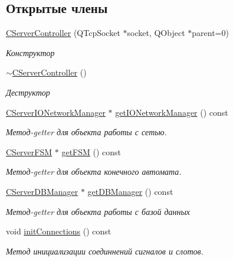 \subsection*{Открытые члены}
\begin{DoxyCompactItemize}
\item 
\hyperlink{class_c_server_controller_ac7fa78891be114aa9ae1985541d5a766}{C\+Server\+Controller} (Q\+Tcp\+Socket $\ast$socket, Q\+Object $\ast$parent=0)
\begin{DoxyCompactList}\small\item\em Конструктор \end{DoxyCompactList}\item 
\hyperlink{class_c_server_controller_ad1efc4b48869ea320005a9dc6e3e5483}{$\sim$\+C\+Server\+Controller} ()
\begin{DoxyCompactList}\small\item\em Деструктор \end{DoxyCompactList}\item 
\hyperlink{class_c_server_i_o_network_manager}{C\+Server\+I\+O\+Network\+Manager} $\ast$ \hyperlink{class_c_server_controller_a9934f4eb54e1e1debd1aa6fd5e036012}{get\+I\+O\+Network\+Manager} () const
\begin{DoxyCompactList}\small\item\em Метод-\/getter для объекта работы с сетью. \end{DoxyCompactList}\item 
\hyperlink{class_c_server_f_s_m}{C\+Server\+F\+SM} $\ast$ \hyperlink{class_c_server_controller_ade77d98a3358e5b1914ebbffa7d810ce}{get\+F\+SM} () const
\begin{DoxyCompactList}\small\item\em Метод-\/getter для объекта конечного автомата. \end{DoxyCompactList}\item 
\hyperlink{class_c_server_d_b_manager}{C\+Server\+D\+B\+Manager} $\ast$ \hyperlink{class_c_server_controller_a2dc0dbf4a5ee9356f10b2156ad2ce712}{get\+D\+B\+Manager} () const
\begin{DoxyCompactList}\small\item\em Метод-\/getter для объекта работы с базой данных \end{DoxyCompactList}\item 
void \hyperlink{class_c_server_controller_aeccfde1d541a9f57f8276cc6a24aea12}{init\+Connections} () const
\begin{DoxyCompactList}\small\item\em Метод инициализации соединнений сигналов и слотов. \end{DoxyCompactList}\end{DoxyCompactItemize}
